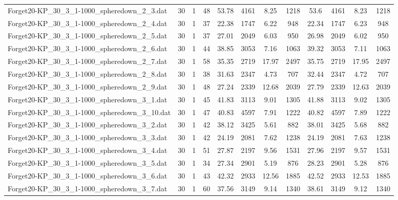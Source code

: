 \begin{sidewaystable}[!ht]
{\begin{tabular}{lccccccccccc}
Forget20-KP\_30\_3\_1-1000\_spheredown\_2\_3.dat & 30 & 1 & 48 & 53.78 & 4161 & 8.25 & 1218 & 53.6 & 4161 &  \textcolor{blue2}{8.23} & 1218 \\
Forget20-KP\_30\_3\_1-1000\_spheredown\_2\_4.dat & 30 & 1 & 37 & 22.38 & 1747 &  \textcolor{blue2}{6.22} & 948 & 22.34 & 1747 & 6.23 & 948 \\
Forget20-KP\_30\_3\_1-1000\_spheredown\_2\_5.dat & 30 & 1 & 37 & 27.01 & 2049 & 6.03 & 950 & 26.98 & 2049 &  \textcolor{blue2}{6.02} & 950 \\
Forget20-KP\_30\_3\_1-1000\_spheredown\_2\_6.dat & 30 & 1 & 44 & 38.85 & 3053 & 7.16 & 1063 & 39.32 & 3053 &  \textcolor{blue2}{7.11} & 1063 \\
Forget20-KP\_30\_3\_1-1000\_spheredown\_2\_7.dat & 30 & 1 & 58 & 35.35 & 2719 & 17.97 & 2497 & 35.75 & 2719 &  \textcolor{blue2}{17.95} & 2497 \\
Forget20-KP\_30\_3\_1-1000\_spheredown\_2\_8.dat & 30 & 1 & 38 & 31.63 & 2347 & 4.73 & 707 & 32.44 & 2347 &  \textcolor{blue2}{4.72} & 707 \\
Forget20-KP\_30\_3\_1-1000\_spheredown\_2\_9.dat & 30 & 1 & 48 & 27.24 & 2339 & 12.68 & 2039 & 27.79 & 2339 &  \textcolor{blue2}{12.63} & 2039 \\
Forget20-KP\_30\_3\_1-1000\_spheredown\_3\_1.dat & 30 & 1 & 45 & 41.83 & 3113 &  \textcolor{blue2}{9.01} & 1305 & 41.88 & 3113 & 9.02 & 1305 \\
Forget20-KP\_30\_3\_1-1000\_spheredown\_3\_10.dat & 30 & 1 & 47 & 40.83 & 4597 & 7.91 & 1222 & 40.82 & 4597 &  \textcolor{blue2}{7.89} & 1222 \\
Forget20-KP\_30\_3\_1-1000\_spheredown\_3\_2.dat & 30 & 1 & 42 & 38.12 & 3425 &  \textcolor{blue2}{5.61} & 882 & 38.01 & 3425 & 5.68 & 882 \\
Forget20-KP\_30\_3\_1-1000\_spheredown\_3\_3.dat & 30 & 1 & 42 & 24.19 & 2081 & 7.62 & 1238 & 24.19 & 2081 & 7.63 & 1238 \\
Forget20-KP\_30\_3\_1-1000\_spheredown\_3\_4.dat & 30 & 1 & 51 & 27.87 & 2197 &  \textcolor{blue2}{9.56} & 1531 & 27.96 & 2197 & 9.57 & 1531 \\
Forget20-KP\_30\_3\_1-1000\_spheredown\_3\_5.dat & 30 & 1 & 34 & 27.34 & 2901 &  \textcolor{blue2}{5.19} & 876 & 28.23 & 2901 & 5.28 & 876 \\
Forget20-KP\_30\_3\_1-1000\_spheredown\_3\_6.dat & 30 & 1 & 43 & 42.32 & 2933 & 12.56 & 1885 & 42.52 & 2933 &  \textcolor{blue2}{12.53} & 1885 \\
Forget20-KP\_30\_3\_1-1000\_spheredown\_3\_7.dat & 30 & 1 & 60 & 37.56 & 3149 & 9.14 & 1340 & 38.61 & 3149 &  \textcolor{blue2}{9.12} & 1340 \\

\end{tabular}}
\end{sidewaystable}
